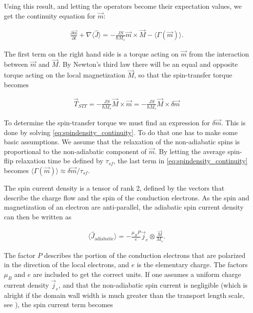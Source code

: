 \documentclass[1p]{elsarticle}		%
\numberwithin{equation}{section}
\begin{document}
Using this result, and letting the operators become their expectation values, we get the continuity equation for $\vec{m}$:

\begin{align}
\label{eq:spindensity_continuity}
\frac{\partial \vec{m}}{\partial t} + \nabla \langle\hat{J}\rangle = -\frac{J S}{\hbar M_s} \vec{m} \times \vec{M} - \langle\Gamma(\vec{m})\rangle.
\end{align}

The first term on the right hand side is a torque acting on $\vec{m}$ from the interaction between $\vec{m}$ and $\vec{M}$. By Newton's third law there will be an equal and opposite torque acting on the local magnetization $\vec{M}$, so that the spin-transfer torque becomes

\begin{align}
\label{eq:STT}
\vec{T}_{STT} = -\frac{J S}{\hbar M_s} \vec{M} \times \vec{m} = -\frac{J S}{\hbar M_s} \vec{M} \times \delta\vec{m}
\end{align}

To determine the spin-transfer torque we must find an expression for $\delta\vec{m}$. This is done by solving \eqref{eq:spindensity_continuity}. To do that one has to make some basic assumptions. We assume that the relaxation of the non-adiabatic spins is proportional to the non-adiabatic component of $\vec{m}$. By letting the average spin-flip relaxation time be defined by $\tau_{sf}$, the last term in \eqref{eq:spindensity_continuity} becomes $\langle\Gamma(\vec{m})\rangle \approx \delta\vec{m}/\tau_{sf}$. 

The spin current density is a tensor of rank 2, defined by the vectors that describe the charge flow and the spin of the conduction electrons. As the spin and magnetization of an electron are anti-parallel, the adiabatic spin current density can then be written as

\begin{align}
\langle \hat{J}_{\textrm{adiabatic}} \rangle = -\frac{\mu_B P}{e} \vec{j}_e \otimes \frac{\vec{M}}{M_s}.
\end{align}

The factor $P$ describes the portion of the conduction electrons that are polarized in the direction of the local electrons, and $e$ is the elementary charge. The factors $\mu_B$ and $e$ are included to get the correct units. If one assumes a uniform charge current density $\vec{j}_e$, and that the non-adiabatic spin current is negligible (which is alright if the domain wall width is much greater than the transport length scale, see \cite{ZhangLi-04}), the spin current term becomes
\end{document}

